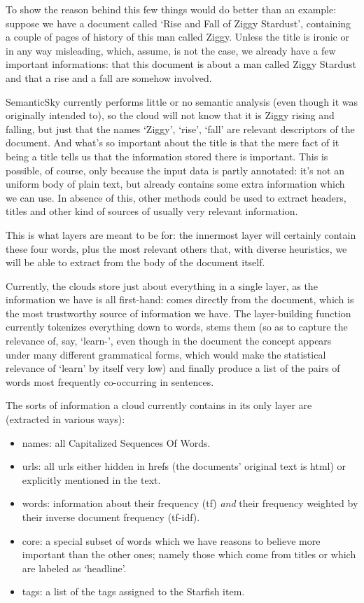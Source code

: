 \documentclass[11pt]{article}
\begin{document}
To show the reason behind this few things would do better than an example: suppose we have a document called `Rise and Fall of Ziggy Stardust', containing a couple of pages of history of this man called Ziggy. Unless the title is ironic or in any way misleading, which, assume, is not the case, we already have a few important informations: that this document is about a man called Ziggy Stardust and that a rise and a fall are somehow involved.

SemanticSky currently performs little or no semantic analysis (even though it was originally intended to), so the cloud will not know that it is Ziggy rising and falling, but just that the names `Ziggy', `rise', `fall' are relevant descriptors of the document. And what's so important about the title is that the mere fact of it being a title tells us that the information stored there is important. This is possible, of course, only because the input data is partly annotated: it's not an uniform body of plain text, but already contains some extra information which we can use. In absence of this, other methods could be used to extract headers, titles and other kind of sources of usually very relevant information.

This is what layers are meant to be for: the innermost layer will certainly contain these four words, plus the most relevant others that, with diverse heuristics, we will be able to extract from the body of the document itself.

Currently, the clouds store just about everything in a single layer, as the information we have is all first-hand: comes directly from the document, which is the most trustworthy source of information we have. The layer-building function currently tokenizes everything down to words, stems them (so as to capture the relevance of, say, `learn-', even though in the document the concept appears under many different grammatical forms, which would make the statistical relevance of `learn' by itself very low) and finally produce a list of the pairs of words most frequently co-occurring in sentences.

The sorts of information a cloud currently contains in its only layer are (extracted in various ways):
\begin{itemize}
\item names: all Capitalized Sequences Of Words.
\item urls: all urls either hidden in hrefs (the documents' original text is html) or explicitly mentioned in the text.
\item words: information about their frequency (tf) \emph{and} their frequency weighted by their inverse document frequency (tf-idf).
\item core: a special subset of words which we have reasons to believe more important than the other ones; namely those which come from titles or which are labeled as `headline'.
\item tags: a list of the tags assigned to the Starfish item.
\end{itemize}
\end{document}
